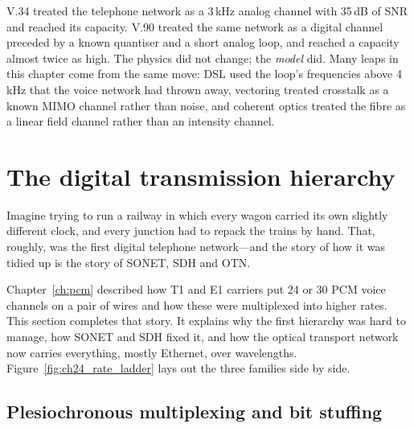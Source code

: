 \begin{keyidea}
V.34 treated the telephone network as a 3\,kHz analog channel with 35\,dB of SNR and reached its
capacity. V.90 treated the same network as a digital channel preceded by a known quantiser and a
short analog loop, and reached a capacity almost twice as high. The physics did not change; the
\emph{model} did. Many leaps in this chapter come from the same move: DSL used the loop's
frequencies above 4\,kHz that the voice network had thrown away, vectoring treated crosstalk as a
known MIMO channel rather than noise, and coherent optics treated the fibre as a linear field
channel rather than an intensity channel.
\end{keyidea}


\section{The digital transmission hierarchy}
\label{sec:ch24:hierarchy}

Imagine trying to run a railway in which every wagon carried its own slightly different clock, and
every junction had to repack the trains by hand. That, roughly, was the first digital telephone
network---and the story of how it was tidied up is the story of SONET, SDH and OTN.

Chapter~\ref{ch:pcm} described how T1 and E1 carriers put 24 or 30 PCM voice channels on a pair of
wires and how these were multiplexed into higher rates. This section completes that story. It
explains why the first hierarchy was hard to manage, how SONET and SDH fixed it, and how the optical
transport network now carries everything, mostly Ethernet, over wavelengths.
Figure~\ref{fig:ch24_rate_ladder} lays out the three families side by side.



\subsection{Plesiochronous multiplexing and bit stuffing}

